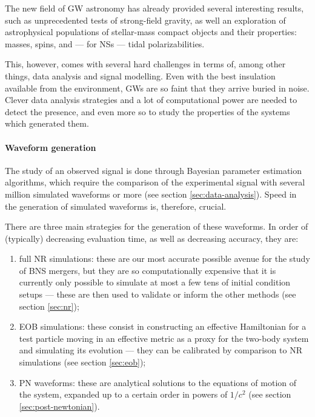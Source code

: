 \documentclass[main.tex]{subfiles}
\begin{document}
The new field of \ac{GW} astronomy has already provided several interesting results, such as unprecedented tests of strong-field gravity, as well an exploration of astrophysical populations of stellar-mass compact objects and their properties: masses, spins, and --- for \acp{NS} --- tidal polarizabilities. 

This, however, comes with several hard challenges in terms of, among other things, data analysis and signal modelling.
Even with the best insulation available from the environment, \acp{GW} are so faint that they arrive buried in noise. 
Clever data analysis strategies and a lot of computational power are needed to detect the presence, and even more so to study the properties of the systems which generated them.

\paragraph{Waveform generation}

The study of an observed signal is done through Bayesian parameter estimation algorithms, which require the comparison of the experimental signal with several million \cite{lackeyEffectiveonebodyWaveformsBinary2017} simulated waveforms or more (see section \ref{sec:data-analysis}).
Speed in the generation of simulated waveforms is, therefore, crucial.

There are three main strategies for the generation of these waveforms. In order of (typically) decreasing evaluation time, as well as decreasing accuracy, they are:
\begin{enumerate}
    \item full \ac{NR} simulations: these are our most accurate possible avenue for the study of \ac{BNS} mergers, but they are so computationally expensive that it is currently only possible to simulate at most a few tens of initial condition setups --- these are then used to validate or inform the other methods (see section \ref{sec:nr});
    \item \ac{EOB} simulations: these consist in constructing an effective Hamiltonian for a test particle moving in an effective metric as a proxy for the two-body system and simulating its evolution --- they can be calibrated by comparison to \ac{NR} simulations (see section \ref{sec:eob});
    \item \ac{PN} waveforms: these are analytical solutions to the equations of motion of the system, expanded up to a certain order in powers of $1/c^2$ (see section \ref{sec:post-newtonian}).
\end{enumerate}
\end{document}
